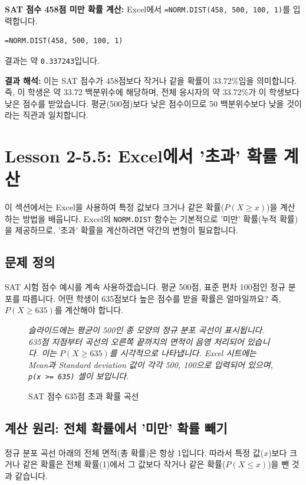 \documentclass[11pt,a4paper]{book}
\providecommand{\newsection}{\section}
\theoremstyle{definition}
\begin{document}
\begin{examplebox}
    \textbf{SAT 점수 458점 미만 확률 계산:}
    Excel에서 \texttt{=NORM.DIST(458, 500, 100, 1)}를 입력합니다.
    \begin{lstlisting}[caption={Excel에서 '미만' 확률 계산 예시}, label={lst:norm_dist_less_than}]
=NORM.DIST(458, 500, 100, 1)
    \end{lstlisting}
    결과는 약 \texttt{0.337243}입니다.

    \textbf{결과 해석:}
    이는 SAT 점수가 458점보다 작거나 같을 확률이 33.72\%임을 의미합니다.
    즉, 이 학생은 약 33.72 백분위수에 해당하며, 전체 응시자의 약 33.72\%가 이 학생보다 낮은 점수를 받았습니다.
    평균(500점)보다 낮은 점수이므로 50 백분위수보다 낮을 것이라는 직관과 일치합니다.
\end{examplebox}

\newsection{Lesson 2-5.5: Excel에서 '초과' 확률 계산}

이 섹션에서는 Excel을 사용하여 특정 값보다 크거나 같은 확률($P(X \ge x)$)을 계산하는 방법을 배웁니다.
Excel의 \texttt{NORM.DIST} 함수는 기본적으로 '미만' 확률(누적 확률)을 제공하므로, '초과' 확률을 계산하려면 약간의 변형이 필요합니다.

\subsection{문제 정의}
SAT 시험 점수 예시를 계속 사용하겠습니다. 평균 500점, 표준 편차 100점인 정규 분포를 따릅니다.
어떤 학생이 635점보다 높은 점수를 받을 확률은 얼마일까요?
즉, $P(X \ge 635)$를 계산해야 합니다.

\begin{figure}[h!]
    \centering
    \caption{SAT 점수 635점 초과 확률 곡선}
    \label{fig:sat_greater_than}
    \vspace{0.5em}
    \textit{슬라이드에는 평균이 500인 종 모양의 정규 분포 곡선이 표시됩니다. 635점 지점부터 곡선의 오른쪽 끝까지의 면적이 음영 처리되어 있습니다. 이는 $P(X \ge 635)$를 시각적으로 나타냅니다. Excel 시트에는 Mean과 Standard deviation 값이 각각 500, 100으로 입력되어 있으며, \texttt{p(x >= 635)} 셀이 보입니다.}
\end{figure}

\subsection{계산 원리: 전체 확률에서 '미만' 확률 빼기}
정규 분포 곡선 아래의 전체 면적(총 확률)은 항상 1입니다.
따라서 특정 값($x$)보다 크거나 같은 확률은 전체 확률(1)에서 그 값보다 작거나 같은 확률($P(X \le x)$)을 뺀 것과 같습니다.
\end{document}
